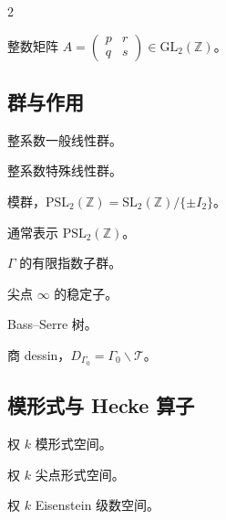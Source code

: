 \documentclass[10pt,UTF8]{ctexart}
\theoremstyle{definition}
\theoremstyle{remark}
\begin{document}
\begin{multicols}{2}
\begin{description}[leftmargin=2.8cm, labelwidth=2.5cm, style=nextline]
\item[\(A\)]
整数矩阵 \(A=\begin{pmatrix}p&r\\q&s\end{pmatrix}\in\mathrm{GL}_2(\mathbb Z)\)。

\end{description}

\subsection*{群与作用}
\begin{description}[leftmargin=2.8cm, labelwidth=2.5cm, style=nextline]

\item[\(\mathrm{GL}_2(\mathbb Z)\)]
整系数一般线性群。

\item[\(\mathrm{SL}_2(\mathbb Z)\)]
整系数特殊线性群。

\item[\(\mathrm{PSL}_2(\mathbb Z)\)]
模群，\(\mathrm{PSL}_2(\mathbb Z)=\mathrm{SL}_2(\mathbb Z)/\{\pm I_2\}\)。

\item[\(\Gamma\)]
通常表示 \(\mathrm{PSL}_2(\mathbb Z)\)。

\item[\(\Gamma_0\)]
\(\Gamma\) 的有限指数子群。

\item[\(\Gamma_\infty\)]
尖点 \(\infty\) 的稳定子。

\item[\(\mathcal T\)]
Bass--Serre 树。

\item[\(D_{\Gamma_0}\)]
商 dessin，\(D_{\Gamma_0}=\Gamma_0\backslash\mathcal T\)。

\end{description}

\subsection*{模形式与 Hecke 算子}
\begin{description}[leftmargin=2.8cm, labelwidth=2.5cm, style=nextline]

\item[\(M_k(\Gamma)\)]
权 \(k\) 模形式空间。

\item[\(S_k(\Gamma)\)]
权 \(k\) 尖点形式空间。

\item[\(\mathcal E_k(\Gamma)\)]
权 \(k\) Eisenstein 级数空间。


\end{description}
\end{multicols}
\end{document}
